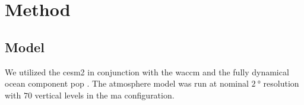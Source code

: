 \documentclass{ametsocV6.1}
\begin{document}
\section{Method}\label{sec:method}

\subsection{Model}

%

We utilized the \gls{cesm2} \citep{danabasoglu2020} in conjunction with the \gls{waccm}
\citep{gettleman2019} and the fully dynamical ocean component \gls{pop}
\citep{smith2010, danabasoglu2020}. The atmosphere model was run at nominal
\(\SI{2}{\degree}\) resolution with \(70\) vertical levels in the \gls{ma}
configuration.
\end{document}
